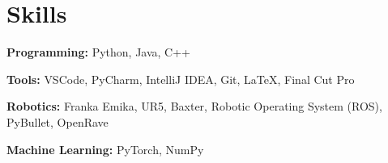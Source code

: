\documentclass[letterpaper,11pt]{article}
\makeatletter
\newcommand{\resumeOrganizationHeading}[4]{
  \vspace{-2pt}\item
    \begin{tabular*}{0.97\textwidth}[t]{l@{\extracolsep{\fill}}r}
      \textbf{#1} & \textit{\small #2} \\
      \textit{\small#3}
    \end{tabular*}\vspace{-7pt}
}
\newcommand{\resumeSubHeadingListStart}{\begin{itemize}[leftmargin=0.15in, label={}]}
\newcommand{\resumeSubHeadingListEnd}{\end{itemize}}
\makeatother
\begin{document}

\section{Skills}
\resumeSubHeadingListStart
\small{\item{
    \textbf{Programming:} {Python, Java, C++} \\ \vspace{1pt}
    
    \textbf{Tools:} {VSCode, PyCharm, IntelliJ IDEA, Git, LaTeX, Final Cut Pro } \\ \vspace{1pt}
    
    \textbf{Robotics:} {Franka Emika, UR5, Baxter, Robotic Operating System (ROS), PyBullet, OpenRave}\\ \vspace{1pt}

    \textbf{Machine Learning:} {PyTorch, NumPy}
    
}}
\resumeSubHeadingListEnd


    
    




    
    
\end{document}
